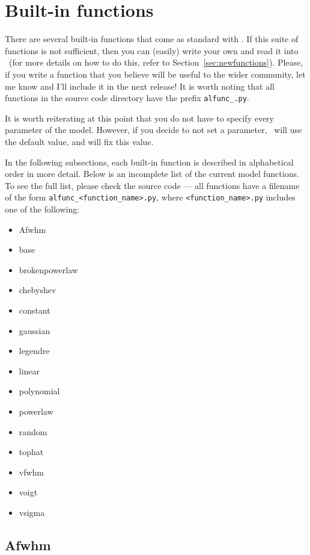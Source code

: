 \section{Built-in functions}
\label{sec:functions}

There are several built-in functions that come as standard with
\alis. If this suite of functions is not sufficient, then you can (easily)
write your own and read it into \alis\ (for more details on how to
do this, refer to Section~\ref{sec:newfunctions}). Please, if you write
a function that you believe will be useful to the wider community,
let me know and I'll include it in the next release! It is worth noting
that all functions in the source code directory have the prefix
\texttt{alfunc\_<function name>.py}.

It is worth reiterating at this point that you do not have to specify
every parameter of the model. However, if you decide to not
set a parameter, \alis\ will use the default value, and will fix this
value.

In the following subsections, each built-in function is described
in alphabetical order in more detail. Below is an incomplete list of
the current model functions. To see the full list, please check the
source code --- all functions have a filename of the form
\texttt{alfunc\_<function\_name>.py}, where \texttt{<function\_name>.py}
includes one of the following:
\begin{multicols}{2}
\begin{itemize}
\item Afwhm
\item base
\item brokenpowerlaw
\item chebyshev
\item constant
\item gaussian
\item legendre
\item linear
\item polynomial
\item powerlaw
\item random
\item tophat
\item vfwhm
\item voigt
\item vsigma
\end{itemize}
\end{multicols}


\subsection{Afwhm}

